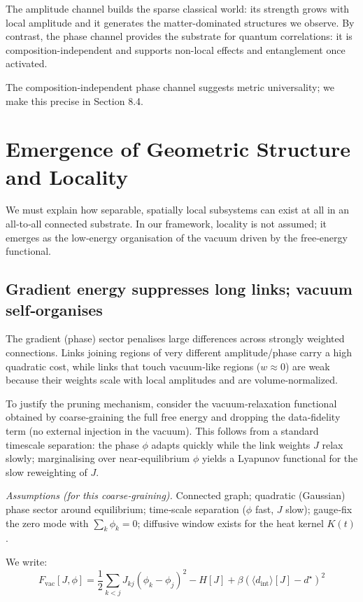 \documentclass[11pt]{article}
\begin{document}
The amplitude channel builds the sparse classical world: its strength grows with local amplitude and it generates the matter-dominated structures we observe. By contrast, the phase channel provides the substrate for quantum correlations: it is composition-independent and supports non-local effects and entanglement once activated.

The composition‑independent phase channel suggests metric universality; we make this precise in Section 8.4.

\section{Emergence of Geometric Structure and Locality}

We must explain how separable, spatially local subsystems can exist at all in an all‑to‑all connected substrate. In our framework, locality is not assumed; it emerges as the low‑energy organisation of the vacuum driven by the free‑energy functional.

\subsection{Gradient energy suppresses long links; vacuum self‑organises}

The gradient (phase) sector penalises large differences across strongly weighted connections. Links joining regions of very different amplitude/phase carry a high quadratic cost, while links that touch vacuum‑like regions ($w\approx0$) are weak because their weights scale with local amplitudes and are volume‑normalized.

To justify the pruning mechanism, consider the vacuum‑relaxation functional obtained by coarse‑graining the full free energy and dropping the data‑fidelity term (no external injection in the vacuum). This follows from a standard timescale separation: the phase $\phi$ adapts quickly while the link weights $J$ relax slowly; marginalising over near‑equilibrium $\phi$ yields a Lyapunov functional for the slow reweighting of $J$.

\noindent \textit{Assumptions (for this coarse‑graining).} Connected graph; quadratic (Gaussian) phase sector around equilibrium; time‑scale separation ($\phi$ fast, $J$ slow); gauge‑fix the zero mode with $\sum_k \phi_k=0$; diffusive window exists for the heat kernel $K(t)$.

We write:
\begin{equation}
F_{\text{vac}}[J, \phi] = \frac{1}{2} \sum_{k<j} J_{kj} (\phi_k - \phi_j)^2 - H[J] + \beta (\langle d_{\text{int}} \rangle[J] - d^\star)^2
\end{equation}
\end{document}
